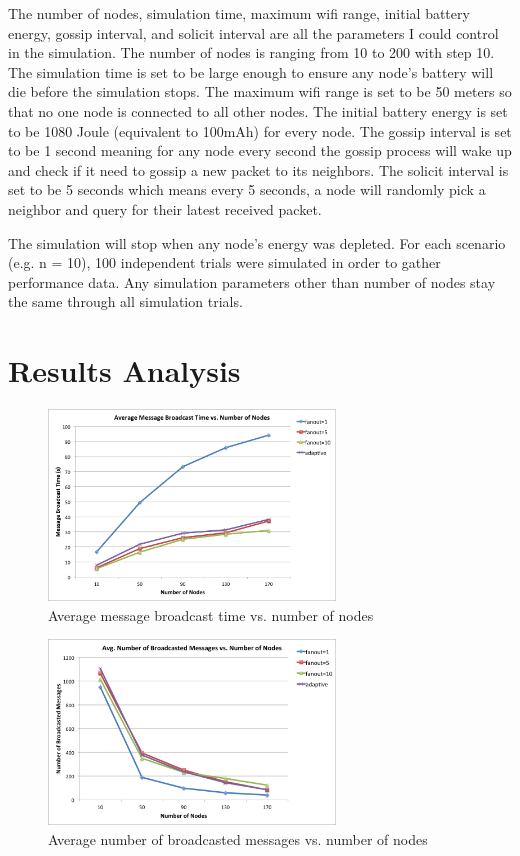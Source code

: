 The number of nodes, simulation time, maximum wifi range, initial battery energy, gossip interval, and solicit interval are all the parameters I could control in the simulation. The number of nodes is ranging from 10 to 200 with step 10. The simulation time is set to be large enough to ensure any node's battery will die before the simulation stops. The maximum wifi range is set to be 50 meters so that no one node is connected to all other nodes. The initial battery energy is set to be 1080 Joule (equivalent to 100mAh) for every node. The gossip interval is set to be 1 second meaning for any node every second the gossip process will wake up and check if it need to gossip a new packet to its neighbors. The solicit interval is set to be 5 seconds which means every 5 seconds, a node will randomly pick a neighbor and query for their latest received packet. 




The simulation will stop when any node's energy was depleted. For each scenario (e.g. n = 10), 100 independent trials were simulated in order to gather performance data. Any simulation parameters other than number of nodes stay the same through all simulation trials. 


\section{Results Analysis}


\begin{figure}
	\centering
	\includegraphics[width=3in]{brTime.png}
	\caption{Average message broadcast time vs. number of nodes}
	\label{fig:brTime}
\end{figure}

\begin{figure}
	\centering
	\includegraphics[width=3in]{brNum.png}
	\caption{Average number of broadcasted messages vs. number of nodes}
	\label{fig:brNum}
\end{figure}

